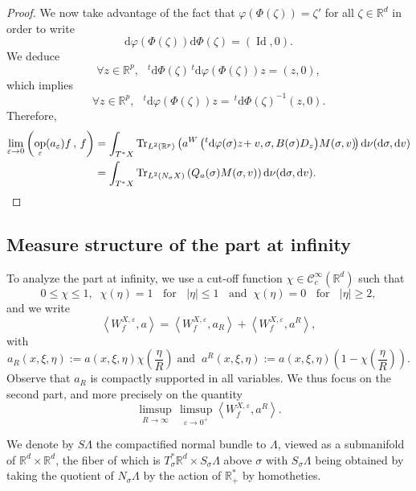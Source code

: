 \documentclass[10pt]{amsart}
\theoremstyle{definition}
\DeclareMathOperator{\Id}{Id}
\DeclareMathOperator{\Trr}{Tr}
\DeclareMathOperator{\op}{op}
\newcommand*\R{{\mathbb R}}
\newcommand*\eps{\varepsilon}
\numberwithin{equation}{section}
\let\oldforall\forall
\renewcommand*{\forall}{\mathrel{\oldforall}}
\newcommand*{\dd}{\mathrm{d}}
\newcommand*{\dv}{\dd v}
\newcommand*{\dnu}{\dd \nu}
\newcommand*{\dsigma}{\dd \sigma}
\newcommand*{\dphi}{\dd \varphi}
\newcommand*{\dPhi}{\dd \Phi} %
\begin{document}
\begin{proof}
We now take advantage of the fact that $\varphi(\Phi(\zeta))=\zeta'$ for all $\zeta\in\R^d$ in order to write
\[
\dphi(\Phi(\zeta))\dPhi (\zeta)=({\Id}, 0).
\]
We deduce
\[
\forall z\in \R^p,\;\; \,^t\dPhi (\zeta) \,^t\dphi(\Phi(\zeta)) z=(z,0),
\]
which implies
\[
\forall z\in \R^p,\;\; \,^t \dphi(\Phi(\zeta)) z= \,^t\dPhi (\zeta)^{-1} (z,0).
\]
Therefore,
\begin{align*}
\lim_{\eps\rightarrow 0} \left(\op_\eps(a_\eps)f\,,\,f\right)& = \int_{T^*X} {\Trr}_{L^2(\R^p)} \left(a^W\left(^t \dphi(\sigma)z\!+v, \sigma,B(\sigma)D_z\right)\! M(\sigma,v)\!\right)\dnu(\dsigma,\dv)\\
& = \int_{T^*X} {\Trr}_{L^2(N_\sigma X)} \left(Q_a(\sigma)M(\sigma,v)\right)\dnu(\dsigma,\dv).\qedhere
\end{align*}
\end{proof}



\subsection{Measure structure of the part at infinity}



To analyze the part at infinity, we use a cut-off function $\chi\in{\mathcal C} _c^\infty (\R^d)$ such that
\[
0\leq \chi\leq 1, \;\;\chi(\eta)=1\;\;\text{ for }\;\; |\eta|\leq 1\;\;\text{ and}\;\; \chi(\eta)=0 \;\;\text{ for }\;\;|\eta|\geq 2,
\]
and we write
\[
\left\langle W^{X,\eps}_{f},a\right\rangle=\left\langle W^{X,\eps}_{f},a_{R}\right\rangle+\left\langle W^{X,\eps}_{f},a^{ R}\right\rangle,
\]
with
\begin{equation}\label{def:aR}
a_{R}(x,\xi,\eta):=a(x,\xi,\eta) \chi\left(\frac{\eta}{R}\right)\;\text{and}\;\;a^{R}(x,\xi,\eta):=a(x,\xi,\eta) \left(1-\chi\left(\frac{\eta}{R}\right)\right).
\end{equation}
Observe that $a_R$ is compactly supported in all variables. We thus focus on the second part, and more precisely on the quantity
\[
\limsup_{R\to\infty}\, \limsup_{\eps\to 0^+}\left\langle W^{X,\eps}_{f},a^R\right\rangle.
\]


We denote by $S\Lambda$ the compactified normal bundle to $\Lambda$, viewed as a submanifold of $\R^d\times \R^d$, the fiber of which is $T^*_\sigma\R^d\times S_\sigma\Lambda$ above $\sigma$ with $S_\sigma\Lambda$ being obtained by taking the quotient of $N_\sigma\Lambda$ by the action of $\R^*_+$ by homotheties.
\end{document}
